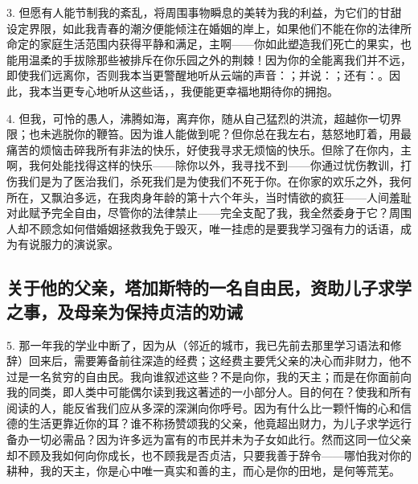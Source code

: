 3. 但愿有人能节制我的紊乱，将周围事物瞬息的美转为我的利益，为它们的甘甜设定界限，如此我青春的潮汐便能倾注在婚姻的岸上，如果他们不能在你的法律所命定的家庭生活范围内获得平静和满足，主啊——你如此塑造我们死亡的果实，也能用温柔的手拔除那些被排斥在你乐园之外的荆棘！因为你的全能离我们并不远，即使我们远离你，否则我本当更警醒地听从云端的声音：；并说：；还有：。因此，我本当更专心地听从这些话，，我便能更幸福地期待你的拥抱。\par

4. 但我，可怜的愚人，沸腾如海，离弃你，随从自己猛烈的洪流，超越你一切界限；也未逃脱你的鞭笞。因为谁人能做到呢？但你总在我左右，慈怒地盯着，用最痛苦的烦恼击碎我所有非法的快乐，好使我寻求无烦恼的快乐。但除了在你内，主啊，我何处能找得这样的快乐——除你以外，我寻找不到——你通过忧伤教训，打伤我们是为了医治我们，杀死我们是为使我们不死于你。在你家的欢乐之外，我何所在，又飘泊多远，在我肉身年龄的第十六个年头，当时情欲的疯狂——人间羞耻对此赋予完全自由，尽管你的法律禁止——完全支配了我，我全然委身于它？周围人却不顾念如何借婚姻拯救我免于毁灭，唯一挂虑的是要我学习强有力的话语，成为有说服力的演说家。\par


\subsection{关于他的父亲，塔加斯特的一名自由民，资助儿子求学之事，及母亲为保持贞洁的劝诫}

5. 那一年我的学业中断了，因为从（邻近的城市，我已先前去那里学习语法和修辞）回来后，需要筹备前往深造的经费；这经费主要凭父亲的决心而非财力，他不过是一名贫穷的自由民。我向谁叙述这些？不是向你，我的天主；而是在你面前向我的同类，即人类中可能偶尔读到我这著述的一小部分人。目的何在？使我和所有阅读的人，能反省我们应从多深的深渊向你呼号。因为有什么比一颗忏悔的心和信德的生活更靠近你的耳？谁不称扬赞颂我的父亲，他竟超出财力，为儿子求学远行备办一切必需品？因为许多远为富有的市民并未为子女如此行。然而这同一位父亲却不顾及我如何向你成长，也不顾我是否贞洁，只要我善于辞令——哪怕我对你的耕种，我的天主，你是心中唯一真实和善的主，而心是你的田地，是何等荒芜。\par

